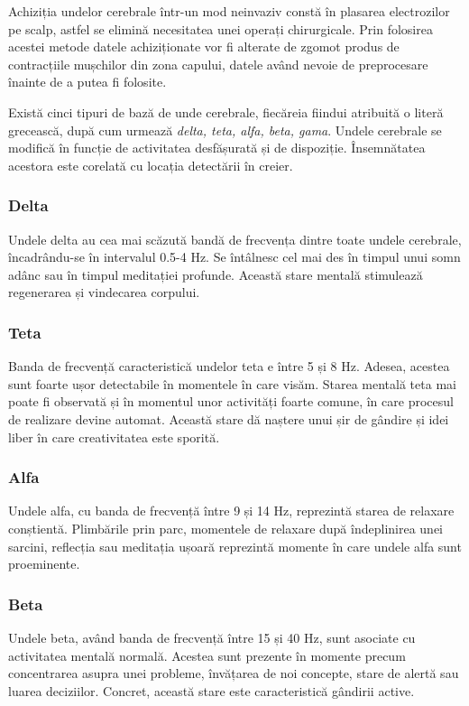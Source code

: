 Achiziția undelor cerebrale într-un mod neinvaziv constă în plasarea electrozilor pe scalp, astfel se elimină necesitatea unei operați chirurgicale. Prin folosirea acestei metode datele achiziționate vor fi alterate de zgomot produs de contracțiile mușchilor din zona capului, datele având nevoie de preprocesare înainte de a putea fi folosite.

Există cinci tipuri de bază de unde cerebrale, fiecăreia fiindui atribuită o literă grecească, după cum urmează \textit{delta, teta, alfa, beta, gama}. Undele cerebrale se modifică în funcție de activitatea desfășurată și de dispoziție. Însemnătatea acestora este corelată cu locația detectării în creier.

\subsubsection*{Delta}\label{ssch:delta}
Undele delta au cea mai scăzută bandă de frecvența dintre toate undele cerebrale, încadrându-se în intervalul 0.5-4 \si{\hertz}. Se întâlnesc cel mai des în timpul unui somn adânc sau în timpul meditației profunde. Această stare mentală stimulează regenerarea și vindecarea corpului.

\subsubsection*{Teta}\label{sush:teta}
Banda de frecvență caracteristică undelor teta e între 5 și 8 \si{\hertz}. Adesea, acestea sunt foarte ușor detectabile în momentele în care visăm. Starea mentală teta mai poate fi observată și în momentul unor activități foarte comune, în care procesul de realizare devine automat. Această stare dă naștere unui șir de gândire și idei liber în care creativitatea este sporită.

\subsubsection*{Alfa}\label{sush:alfa}
Undele alfa, cu banda de frecvență între 9 și 14 \si{\hertz},  reprezintă starea de relaxare conștientă. Plimbările prin parc, momentele de relaxare după îndeplinirea unei sarcini, reflecția  sau meditația ușoară reprezintă momente în care undele alfa sunt proeminente.

\subsubsection*{Beta}\label{sush:beta}
Undele beta, având banda de frecvență între 15 și 40 \si{\hertz}, sunt asociate cu activitatea mentală normală. Acestea sunt prezente în momente precum concentrarea asupra unei probleme, învățarea de noi concepte, stare de alertă sau luarea deciziilor. Concret, această stare este caracteristică gândirii active.

